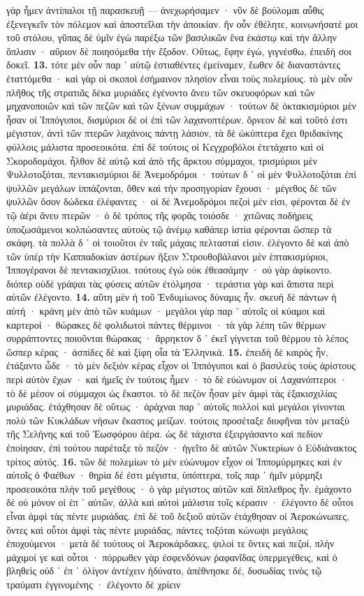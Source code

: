 \documentclass[a4paper, 11pt, oneside, polutonikogreek, german]{article}
\begin{document}
γὰρ ἦμεν ἀντίπαλοι τῇ παρασκευῇ --- ἀνεχωρήσαμεν · νῦν δὲ βούλομαι αὖθις ἐξενεγκεῖν τὸν πόλεμον καὶ ἀποστεῖλαι τὴν ἀποικίαν. ἢν οὖν ἐθέλητε, κοινωνήσατέ μοι τοῦ στόλου, γῦπας δὲ ὑμῖν ἐγὼ παρέξω τῶν βασιλικῶν ἕνα ἑκάστῳ καὶ τὴν ἄλλην ὅπλισιν · αὔριον δὲ ποιησόμεθα τὴν ἔξοδον. Οὕτως, ἔφην ἐγώ, γιγνέσθω, ἐπειδή σοι δοκεῖ. \textbf{13.} τότε μὲν οὖν παρ ᾽ αὐτῷ ἑστιαθέντες ἐμείναμεν, ἕωθεν δὲ διαναστάντες ἐταττόμεθα · καὶ γὰρ οἱ σκοποὶ ἐσήμαινον πλησίον εἶναι τοὺς πολεμίους. τὸ μὲν οὖν πλῆθος τῆς στρατιᾶς δέκα μυριάδες ἐγένοντο ἄνευ τῶν σκευοφόρων καὶ τῶν μηχανοποιῶν καὶ τῶν πεζῶν καὶ τῶν ξένων συμμάχων · τούτων δὲ ὀκτακισμύριοι μὲν ἦσαν οἱ Ἱππόγυποι, δισμύριοι δὲ οἱ ἐπὶ τῶν λαχανοπτέρων. ὄρνεον δὲ καὶ τοῦτό ἐστι μέγιστον, ἀντὶ τῶν πτερῶν λαχάνοις πάντῃ λάσιον, τὰ δὲ ὠκύπτερα ἔχει θριδακίνης φύλλοις μάλιστα προσεοικότα. ἐπὶ δὲ τούτοις οἱ Κεγχροβόλοι ἐτετάχατο καὶ οἱ Σκοροδομάχοι. ἦλθον δὲ αὐτῷ καὶ ἀπὸ τῆς ἄρκτου σύμμαχοι, τρισμύριοι μὲν Ψυλλοτοξόται, πεντακισμύριοι δὲ Ἀνεμοδρόμοι · τούτων δ ᾽ οἱ μὲν Ψυλλοτοξόται ἐπὶ ψυλλῶν μεγάλων ἱππάζονται, ὅθεν καὶ τὴν προσηγορίαν ἔχουσι · μέγεθος δὲ τῶν ψυλλῶν ὅσον δώδεκα ἐλέφαντες · οἱ δὲ Ἀνεμοδρόμοι πεζοὶ μέν εἰσι, φέρονται δὲ ἐν τῷ ἀέρι ἄνευ πτερῶν · ὁ δὲ τρόπος τῆς φορᾶς τοιόσδε · χιτῶνας ποδήρεις ὑποζωσάμενοι κολπώσαντες αὐτοὺς τῷ ἀνέμῳ καθάπερ ἱστία φέρονται ὥσπερ τὰ σκάφη. τὰ πολλὰ δ ᾽ οἱ τοιοῦτοι ἐν ταῖς μάχαις πελτασταί εἰσιν. ἐλέγοντο δὲ καὶ ἀπὸ τῶν ὑπὲρ τὴν Καππαδοκίαν ἀστέρων ἥξειν Στρουθοβάλανοι μὲν ἑπτακισμύριοι, Ἱππογέρανοι δὲ πεντακισχίλιοι. τούτους ἐγὼ οὐκ ἐθεασάμην · οὐ γὰρ ἀφίκοντο. διόπερ οὐδὲ γράψαι τὰς φύσεις αὐτῶν ἐτόλμησα · τεράστια γὰρ καὶ ἄπιστα περὶ αὐτῶν ἐλέγοντο. \textbf{14.} αὕτη μὲν ἡ τοῦ Ἐνδυμίωνος δύναμις ἦν. σκευὴ δὲ πάντων ἡ αὐτή · κράνη μὲν ἀπὸ τῶν κυάμων · μεγάλοι γὰρ παρ ᾽ αὐτοῖς οἱ κύαμοι καὶ καρτεροί · θώρακες δὲ φολιδωτοὶ πάντες θέρμινοι · τὰ γὰρ λέπη τῶν θέρμων συρράπτοντες ποιοῦνται θώρακας · ἄρρηκτον δ ᾽ ἐκεῖ γίγνεται τοῦ θέρμου τὸ λέπος ὥσπερ κέρας · ἀσπίδες δὲ καὶ ξίφη οἷα τὰ Ἑλληνικά. \textbf{15.} ἐπειδὴ δὲ καιρὸς ἦν, ἐτάξαντο ὧδε · τὸ μὲν δεξιὸν κέρας εἶχον οἱ Ἱππόγυποι καὶ ὁ βασιλεὺς τοὺς ἀρίστους περὶ αὑτὸν ἔχων · καὶ ἡμεῖς ἐν τούτοις ἦμεν · τὸ δὲ εὐώνυμον οἱ Λαχανόπτεροι · τὸ δὲ μέσον οἱ σύμμαχοι ὡς ἕκαστοι. τὸ δὲ πεζὸν ἦσαν μὲν ἀμφὶ τὰς ἑξακισχιλίας μυριάδας. ἐτάχθησαν δὲ οὕτως · ἀράχναι παρ ᾽ αὐτοῖς πολλοὶ καὶ μεγάλοι γίνονται πολὺ τῶν Κυκλάδων νήσων ἕκαστος μείζων. τούτοις προσέταξε διυφῆναι τὸν μεταξὺ τῆς Σελήνης καὶ τοῦ Ἑωσφόρου ἀέρα. ὡς δὲ τάχιστα ἐξειργάσαντο καὶ πεδίον ἐποίησαν, ἐπὶ τούτου παρέταξε τὸ πεζόν · ἡγεῖτο δὲ αὐτῶν Νυκτερίων ὁ Εὐδιάνακτος τρίτος αὐτός. \textbf{16.} τῶν δὲ πολεμίων τὸ μὲν εὐώνυμον εἶχον οἱ Ἱππομύρμηκες καὶ ἐν αὐτοῖς ὁ Φαέθων · θηρία δέ ἐστι μέγιστα, ὑπόπτερα, τοῖς παρ ᾽ ἡμῖν μύρμηξι προσεοικότα πλὴν τοῦ μεγέθους · ὁ γὰρ μέγιστος αὐτῶν καὶ δίπλεθρος ἦν. ἐμάχοντο δὲ οὐ μόνον οἱ ἐπ ᾽ αὐτῶν, ἀλλὰ καὶ αὐτοὶ μάλιστα τοῖς κέρασιν · ἐλέγοντο δὲ οὗτοι εἶναι ἀμφὶ τὰς πέντε μυριάδας. ἐπὶ δὲ τοῦ δεξιοῦ αὐτῶν ἐτάχθησαν οἱ Ἀεροκώνωπες, ὄντες καὶ οὗτοι ἀμφὶ τὰς πέντε μυριάδας, πάντες τοξόται κώνωψι μεγάλοις ἐποχούμενοι · μετὰ δὲ τούτους οἱ Ἀεροκάρδακες, ψιλοί τε ὄντες καὶ πεζοί, πλὴν μάχιμοί γε καὶ οὗτοι · πόρρωθεν γὰρ ἐσφενδόνων ῥαφανῖδας ὑπερμεγέθεις, καὶ ὁ βληθεὶς οὐδ ᾽ ἐπ ᾽ ὀλίγον ἀντέχειν ἠδύνατο, ἀπέθνησκε δέ, δυσωδίας τινὸς τῷ τραύματι ἐγγινομένης · ἐλέγοντο δὲ χρίειν 
\end{document}
